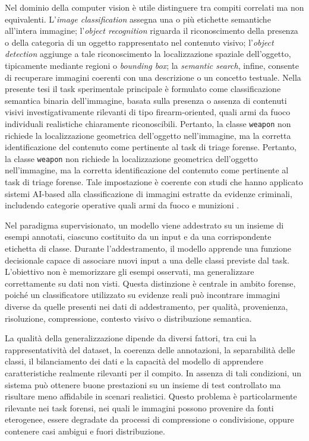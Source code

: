 Nel dominio della computer vision è utile distinguere tra compiti correlati ma
non equivalenti. L'\textit{image classification} assegna una o più etichette
semantiche all'intera immagine; l'\textit{object recognition} riguarda il
riconoscimento della presenza o della categoria di un oggetto rappresentato nel
contenuto visivo; l'\textit{object detection} aggiunge a tale riconoscimento la
localizzazione spaziale dell'oggetto, tipicamente mediante regioni o
\textit{bounding box}; la \textit{semantic search}, infine, consente di
recuperare immagini coerenti con una descrizione o un concetto testuale.
Nella presente tesi il task sperimentale principale è formulato come
classificazione semantica binaria dell'immagine, basata sulla presenza o assenza
di contenuti visivi investigativamente rilevanti di tipo firearm-oriented, quali
armi da fuoco individuali realistiche chiaramente riconoscibili. Pertanto, la
classe \texttt{weapon} non richiede la localizzazione geometrica dell'oggetto
nell'immagine, ma la corretta identificazione del contenuto come pertinente al
task di triage forense.
 Pertanto, la classe \texttt{weapon} non richiede la localizzazione geometrica dell'oggetto
nell'immagine, ma la corretta identificazione del contenuto come pertinente al
task di triage forense. Tale impostazione è coerente con studi che hanno
applicato sistemi AI-based alla classificazione di immagini estratte da evidenze
criminali, includendo categorie operative quali armi da fuoco e munizioni
\cite{silva2021microservices}.

Nel paradigma supervisionato, un modello viene addestrato su un insieme di esempi annotati, ciascuno costituito da un input e da una corrispondente etichetta di classe. Durante l'addestramento, il modello apprende una funzione decisionale capace di associare nuovi input a una delle classi previste dal task. L'obiettivo non è memorizzare gli esempi osservati, ma generalizzare correttamente su dati non visti. Questa distinzione è centrale in ambito forense, poiché un classificatore utilizzato su evidenze reali può incontrare immagini diverse da quelle presenti nei dati di addestramento, per qualità, provenienza, risoluzione, compressione, contesto visivo o distribuzione semantica.

La qualità della generalizzazione dipende da diversi fattori, tra cui la rappresentatività del dataset, la coerenza delle annotazioni, la separabilità delle classi, il bilanciamento dei dati e la capacità del modello di apprendere caratteristiche realmente rilevanti per il compito. In assenza di tali condizioni, un sistema può ottenere buone prestazioni su un insieme di test controllato ma risultare meno affidabile in scenari realistici. Questo problema è particolarmente rilevante nei task forensi, nei quali le immagini possono provenire da fonti eterogenee, essere degradate da processi di compressione o condivisione, oppure contenere casi ambigui e fuori distribuzione.


